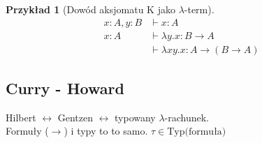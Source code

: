 \documentclass[10pt,a4paper]{article}
\theoremstyle{plain}
\theoremstyle{definition}
\newtheorem*{example}{Przykład}
\newcommand{\impl}{\rightarrow}
\begin{document}
\begin{example}[Dowód aksjomatu K jako $\lambda$-term]
\begin{align*}
x:A, y:B &\vdash x:A \\
x:A &\vdash \lambda y . x : B \impl A \\
&\vdash \lambda xy . x : A \impl (B \impl A)
\end{align*}
\end{example}


\subsection{Curry - Howard}

Hilbert $\leftrightarrow$ Gentzen $\leftrightarrow$ typowany $\lambda$-rachunek.\\
Formuły ($\rightarrow$) i typy to to samo. $\tau\in \text{Typ(formuła)}$
\end{document}

